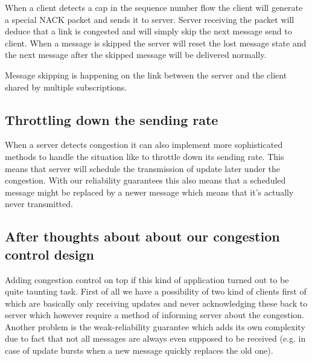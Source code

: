 When a client detects a cap in the sequence number flow the client will generate
a special NACK packet and sends it to server. Server receiving the packet will
deduce that a link is congested and will simply skip the next message send to
client. When a message is skipped the server will reset the lost message state
and the next message after the skipped message will be delivered normally.

Message skipping is happening on the link between the server and the client
shared by multiple subscriptions.

\subsection{Throttling down the sending rate}
When a server detects congestion it can also implement more sophisticated
methods to handle the situation like to throttle down its sending rate. This
means that server will schedule the transmission of update later under the
congestion. With our reliability guarantees this also means that a scheduled
message might be replaced by a newer message which means that it's actually
never transmitted.


\subsection{After thoughts about about our congestion control design}
Adding congestion control on top if this kind of application turned out to be
quite taunting task. First of all we have a possibility of two kind of clients
first of which are basically only receiving updates and never acknowledging
these back to server which however require a method of informing server about
the congestion. Another problem is the weak-reliability guarantee which adds its
own complexity due to fact that not all messages are always even supposed to be
received (e.g. in case of update bursts when a new message quickly replaces the
old one).

